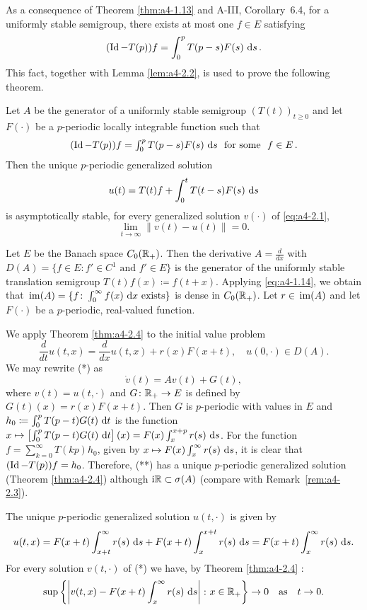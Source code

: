 As a consequence of Theorem \ref{thm:a4-1.13}  and A-III, Corollary~6.4, for a uniformly stable semigroup, there exists at most one $f \in E$ satisfying 
\[
(\operatorname{Id}-T(p))f = \int_{0}^{p} T(p-s)F(s) \,\mathop{}\!\mathrm{d}{s}\,.
\]
This fact, together with Lemma \ref{lem:a4-2.2}, is used to prove the following theorem.
\begin{theorem}\label{thm:a4-2.4}
Let $A$ be the generator of a uniformly stable semigroup $(T(t))_{t \geq 0}$ and let $F(\cdot)$ be a $p$-periodic locally integrable function such that \[\textstyle{
(\operatorname{Id}- T(p))f = \int_{0}^{p} T(p-s)F(s) \,\mathop{}\!\mathrm{d}{s}\ \text{ for some } \ f \in E\,.
}\]
Then the unique $p$-periodic generalized solution
\[
u(t) = T(t)f + \int_{0}^{t} T(t-s)F(s) \,\mathop{}\!\mathrm{d}{s}
\]
is asymptotically stable, \ie for every generalized solution $v(\cdot)$ of \eqref{eq:a4-2.1}, 
\[
\lim_{t \to \infty} \|v(t) - u(t)\| = 0.
\]
\end{theorem}
\begin{example}\label{ex:a4-2.5}
Let $E$ be the Banach space $C_{0}(\mathbb{R}_{+})$. 
Then the derivative  $A = \frac{d}{dx}$ with $D(A) = \{f \in E: f' \in C^{1} \text{ and } f' \in E\}$ is the generator of the uniformly stable translation semigroup $T(t)f(x) \coloneqq f(t+x)$. 
Applying \eqref{eq:a4-1.14}, we obtain that $\mathop{}\mathrm{im}(A) = \{f\colon\int_{0}^{\infty} f(x) \,\mathop{}\!\mathrm{d}{x} \text{ exists}\}$ is dense in $C_{0}(\mathbb{R}_{+})$. 
Let $r \in \mathop{}\mathrm{im}(A)$ and let $F(\cdot)$ be a $p$-periodic, real-valued function.

We apply Theorem \ref{thm:a4-2.4}  to the initial value problem
\begin{equation}
 \frac{d}{dt} u(t,x) = \frac{d}{dx}u(t,x) + r(x)F(x+t), \quad u(0,\cdot) \in D(A). 
 \tag{*}
\end{equation}
We may rewrite (*) as  
\begin{equation}
\dot{v}(t) = Av(t) + G(t), \tag{**}
\end{equation}
where $v(t) = u(t,\cdot)$ and $G\colon\mathbb{R}_{+} \to E$ is defined by $G(t)(x) = r(x)F(x+t)$.
Then $G$ is $p$-periodic with values in $E$ and $h_{0} \coloneqq \int_{0}^{p} T(p-t)G(t) \,\mathop{}\!\mathrm{d}{t}$ is the function $x \mapsto \left[\int_{0}^{p} T(p-t)G(t) \,\mathop{}\!\mathrm{d}{t}\right](x) = F(x)\int_{x}^{x+p} r(s) \,\mathop{}\!\mathrm{d}{s}$. 
For the function $f = \sum_{k=0}^{\infty} T(kp)h_{0}$, given by $x \mapsto F(x)\int_{x}^{\infty} r(s) \,\mathop{}\!\mathrm{d}{s}$, it is clear that $(\operatorname{Id} - T(p))f = h_{0}$. 
Therefore, (**) has a unique $p$-periodic generalized solution (Theorem \ref{thm:a4-2.4}) although $\mathrm{i} \mathbb{R} \subset \sigma(A)$ (compare with Remark~\ref{rem:a4-2.3}).

The unique $p$-periodic generalized solution $u(t,\cdot)$ is given by 
\[
u(t,x) = F(x+t)\int_{x+t}^{\infty} r(s)\,\mathop{}\!\mathrm{d}{s} + F(x+t)\int_{x}^{x+t} r(s)\,\mathop{}\!\mathrm{d}{s} = F(x+t)\int_{x}^{\infty} r(s)\,\mathop{}\!\mathrm{d}{s}.
\]
For every solution $v(t,\cdot)$ of (*) we have, by Theorem \ref{thm:a4-2.4} :
\[
\sup\left\{\left|v(t,x) - F(x+t)\int_{x}^{\infty} r(s) \,\mathop{}\!\mathrm{d}{s}\right| \colon x \in \mathbb{R}_{+}\right\} \to 0 \quad \text{as} \quad t \to 0.
\]
\end{example}
